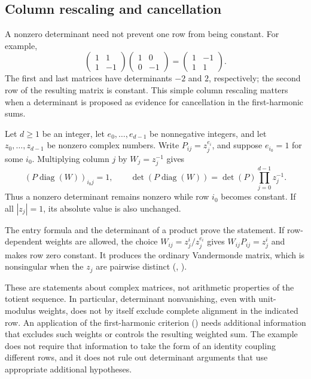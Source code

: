 \subsection{Column rescaling and cancellation}

A nonzero determinant need not prevent one row from being constant.
For example,
\[
 \begin{pmatrix}1&1\\1&-1\end{pmatrix}
 \begin{pmatrix}1&0\\0&-1\end{pmatrix}
 =\begin{pmatrix}1&-1\\1&1\end{pmatrix}.
\]
The first and last matrices have determinants $-2$ and $2$, respectively;
the second row of the resulting matrix is constant. This simple column rescaling
matters when a determinant is proposed as evidence for cancellation in
the first-harmonic sums.

\begin{prop}\label{prop:nonzero-minor-survives-inverse-phase}
Let $d\ge1$ be an integer, let $e_0,\ldots,e_{d-1}$ be nonnegative integers, and let
$z_0,\ldots,z_{d-1}$ be nonzero complex numbers. Write
$P_{ij}=z_j^{e_i}$, and suppose $e_{i_0}=1$ for some $i_0$.
Multiplying column $j$ by $W_j=z_j^{-1}$ gives
\[
 (P\operatorname{diag}(W))_{i_0j}=1,\qquad
 \det(P\operatorname{diag}(W))=\det(P)\prod_{j=0}^{d-1}z_j^{-1}.
\]
Thus a nonzero determinant remains nonzero while row $i_0$ becomes
constant. If all $|z_j|=1$, its absolute value is also unchanged.
\end{prop}
The entry formula and the determinant of a product prove the statement.
If row-dependent weights are allowed, the choice
$W_{ij}=z_j^i/z_j^{e_i}$ gives $W_{ij}P_{ij}=z_j^i$ and makes row zero
constant. It produces the ordinary Vandermonde matrix, which is
nonsingular when the $z_j$ are pairwise distinct
(,
).

These are statements about complex matrices, not arithmetic properties
of the totient sequence. In particular, determinant nonvanishing, even
with unit-modulus weights, does not by itself exclude complete
alignment in the indicated row. An application of the first-harmonic
criterion
()
needs additional information that excludes such weights or controls the
resulting weighted sum. The example does not require that information
to take the form of an identity coupling different rows, and it does
not rule out determinant arguments that use appropriate additional
hypotheses.

